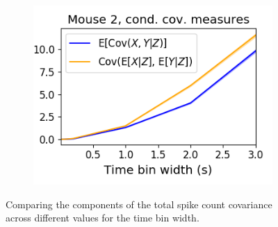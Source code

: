 \documentclass[a4paper,12pt]{article}
\theoremstyle{definition}
\begin{document}
\begin{figure}[h]
\begin{subfigure}[h]{0.5\linewidth}
      \includegraphics[width=\linewidth]{figures/Robbins_cond_cov_comparison.png}
      \label{fig:Robbins_cond_cov_comparison}
    \end{subfigure}
    \caption{Comparing the components of the total spike count covariance across different values for the time bin width. }
    \label{fig:conditional_covariance_comparison}
  \end{figure}
\end{document}

